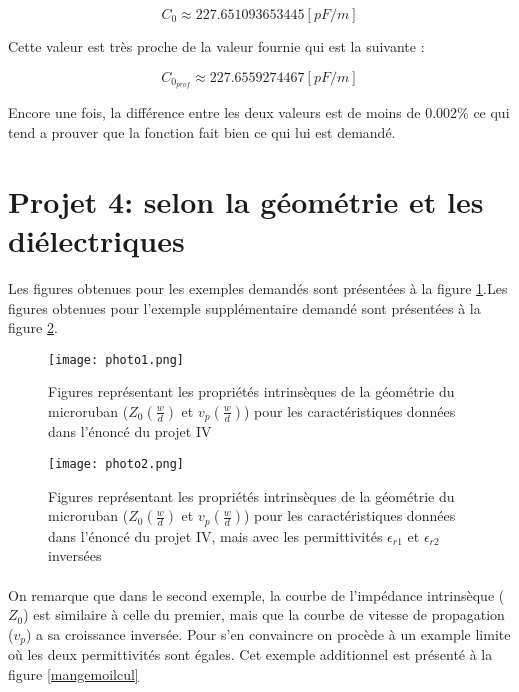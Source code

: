 \begin{equation}
	C_0 \approx 227.651093653445[pF/m]
\end{equation}

Cette valeur est très proche de la valeur fournie qui est la suivante :

\begin{equation}
	C_{0_{prof}} \approx 227.6559274467 [pF/m]
\end{equation}

Encore une fois, la différence entre les deux valeurs est de moins de 0.002\% ce qui tend a prouver que la fonction fait bien ce qui lui est demandé.

\section{Projet 4:  selon la géométrie et les diélectriques}

Les figures obtenues pour les exemples demandés sont présentées à la figure \ref{fig_marde}.Les figures obtenues pour l'exemple supplémentaire demandé sont présentées à la figure \ref{mangedlamarde}.

\begin{figure}[htb]
\begin{center}
\texttt{[image: photo1.png]}
\caption{Figures représentant les propriétés intrinsèques de la géométrie du microruban ($Z_0 (\frac{w}{d})$ et $v_p(\frac{w}{d})$) pour les caractéristiques données dans l'énoncé du projet IV}
\label{fig_marde}
\end{center}
\end{figure}
\begin{figure}[htb]
\begin{center}
\texttt{[image: photo2.png]}
\caption{Figures représentant les propriétés intrinsèques de la géométrie du microruban ($Z_0 (\frac{w}{d})$ et $v_p(\frac{w}{d})$) pour les caractéristiques données dans l'énoncé du projet IV, mais avec les permittivités $\epsilon_{r1}$ et $\epsilon_{r2}$ inversées}
\label{mangedlamarde}
\end{center}
\end{figure}

\paragraph{}On remarque que dans le second exemple, la courbe de l'impédance intrinsèque ($Z_0$) est similaire à celle du premier, mais que la courbe de vitesse de propagation ($v_p$) a sa croissance inversée. Pour s'en convaincre on procède à un example limite où les deux permittivités sont égales. Cet exemple additionnel est présenté à la figure \ref{mangemoilcul}

